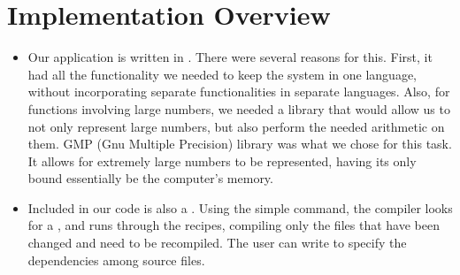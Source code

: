 \section{Implementation Overview}




\begin{itemize}
\item Our application is written in . There were
  several reasons for this. First, it had all the
  functionality we needed to keep the system in one
  language, without incorporating separate functionalities
  in separate languages. Also, for functions involving large
  numbers, we needed a library that would allow us to not
  only represent large numbers, but also perform the needed
  arithmetic on them. GMP (Gnu Multiple Precision) library
  was what we chose for this task. It allows for extremely
  large numbers to be represented, having its only bound
  essentially be the computer's memory.
\item Included in our code is also a .
  Using the simple  command, the compiler looks
  for a , and runs through the recipes,
  compiling only the files that have been changed and need
  to be recompiled. The user can write  to
  specify the dependencies among source files.
\end{itemize}
